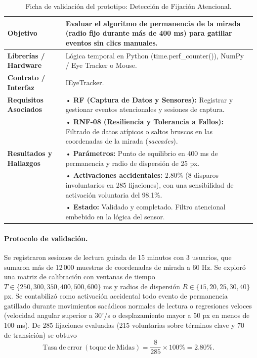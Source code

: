 \begin{table}[H]
    \centering
    \caption{Ficha de validación del prototipo: Detección de Fijación Atencional.}
    \label{tab:ficha_f12}
    \begin{tabular}{|L{3.2cm}|L{11.0cm}|}
        \hline
        \textbf{Objetivo} & Evaluar el algoritmo de permanencia de la mirada (radio fijo durante más de 400 ms) para gatillar eventos sin clics manuales. \\ \hline
        \textbf{Librerías / Hardware} & Lógica temporal en Python (time.perf\_counter()), NumPy / Eye Tracker o Mouse. \\ \hline
        \textbf{Contrato / Interfaz} & IEyeTracker. \\ \hline
        \textbf{Requisitos Asociados} &
        • \textbf{RF (Captura de Datos y Sensores):} Registrar y gestionar eventos atencionales y sesiones de captura. \vspace{0.1cm} \\
        & • \textbf{RNF-08 (Resiliencia y Tolerancia a Fallos):} Filtrado de datos atípicos o saltos bruscos en las coordenadas de la mirada (\textit{saccades}). \\ \hline
        \textbf{Resultados y Hallazgos} &
        • \textbf{Parámetros:} Punto de equilibrio en 400 ms de permanencia y radio de dispersión de 25 px. \vspace{0.1cm} \\
        & • \textbf{Activaciones accidentales:} 2.80\% (8 disparos involuntarios en 285 fijaciones), con una sensibilidad de activación voluntaria del 98.1\%. \vspace{0.1cm} \\
        & • \textbf{Estado:} Validado y completado. Filtro atencional embebido en la lógica del sensor. \\ \hline
    \end{tabular}
\end{table}
 
\paragraph{Protocolo de validación.} Se registraron sesiones de lectura guiada de 15 minutos con 3 usuarios, que sumaron más de 12\,000 muestras de coordenadas de mirada a 60 Hz. Se exploró una matriz de calibración con ventanas de tiempo $T \in \{250, 300, 350, 400, 500, 600\}$ ms y radios de dispersión $R \in \{15, 20, 25, 30, 40\}$ px. Se contabilizó como activación accidental todo evento de permanencia gatillado durante movimientos sacádicos normales de lectura o regresiones veloces (velocidad angular superior a $30^\circ$/s o desplazamiento mayor a 50 px en menos de 100 ms). De 285 fijaciones evaluadas (215 voluntarias sobre términos clave y 70 de transición) se obtuvo
\[ \mathrm{Tasa\ de\ error\ (toque\ de\ Midas)} = \frac{8}{285} \times 100\% = 2.80\%. \]
 
